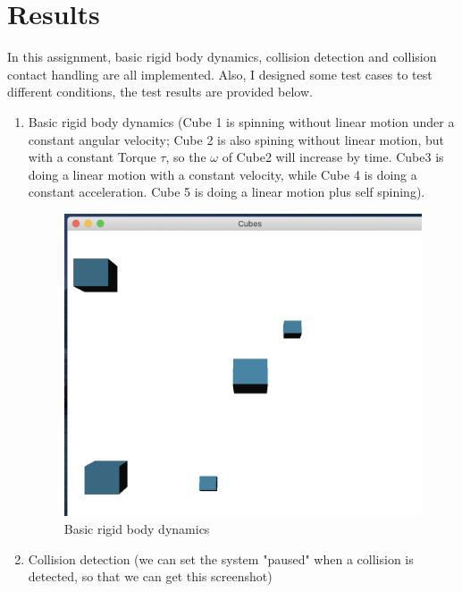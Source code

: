 \documentclass[acmtog]{acmart}
\begin{document}
\section{Results}
	In this assignment, basic rigid body dynamics, collision detection and collision contact handling are all implemented.
	Also, I designed some test cases to test different conditions, the test results are provided below.
	\begin{enumerate}
		\item Basic rigid body dynamics (Cube 1 is spinning without linear motion under a constant angular velocity; 
		Cube 2 is also spining without linear motion, but with a constant Torque $\tau$, so the $\omega$ of Cube2 will increase
		by time. Cube3 is doing a linear motion with a constant velocity, while Cube 4 is doing a constant acceleration. Cube 5 
		is doing a linear motion plus self spining).
		\begin{figure}[H]
			\centering
			\includegraphics[scale=0.2]{basic.png}			
			\caption{Basic rigid body dynamics}
		\end{figure}
		\item Collision detection (we can set the system "paused" when a collision is detected, so that we can get this screenshot)
		\begin{figure}[H]
			\centering

\end{figure}
\end{enumerate}
\end{document}

